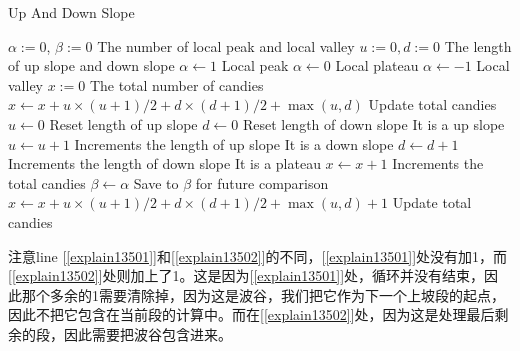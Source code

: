 \begin{algorithm}[H]
\caption{Up And Down Slope}
\begin{algorithmic}[1]
\State $\alpha:=0$, $\beta:=0$ \Comment The number of local peak and local valley
\State $u:=0, d:=0$ \Comment The length of up slope and down slope
\State $\alpha\gets1$ \Comment Local peak
\State $\alpha\gets 0$ \Comment Local plateau
\Else
\State $\alpha\gets -1$ \Comment Local valley
\EndIf
\State $x:=0$ \Comment The total number of candies
\State $x\gets x + u\times(u+1)/2 + d\times(d+1)/2 + \max(u,d)$ \Comment Update total candies \label{explain13501}
\State $u\gets 0$ \Comment Reset length of up slope
\State $d\gets 0$ \Comment Reset length of down slope
\EndIf
{} \Comment It is a up slope
\State $u\gets u+1$ \Comment Increments the length of up slope
\EndIf
{} \Comment It is a down slope
\State $d\gets d+1$ \Comment Increments the length of down slope
\EndIf
{} \Comment It is a plateau
\State $x\gets x+1$ \Comment Increments the total candies
\EndIf
\State $\beta\gets \alpha$ \Comment Save to $\beta$ for future comparison
\EndFor
\State $x\gets x + u\times(u+1)/2 + d\times(d+1)/2 + \max(u,d) + 1$ \Comment Update total candies \label{explain13502}
\EndProcedure
\end{algorithmic}
\end{algorithm}
注意line [\ref{explain13501}]和[\ref{explain13502}]的不同，[\ref{explain13501}]处没有加1，而[\ref{explain13502}]处则加上了1。这是因为[\ref{explain13501}]处，循环并没有结束，因此那个多余的1需要清除掉，因为这是波谷，我们把它作为下一个上坡段的起点，因此不把它包含在当前段的计算中。而在[\ref{explain13502}]处，因为这是处理最后剩余的段，因此需要把波谷包含进来。

